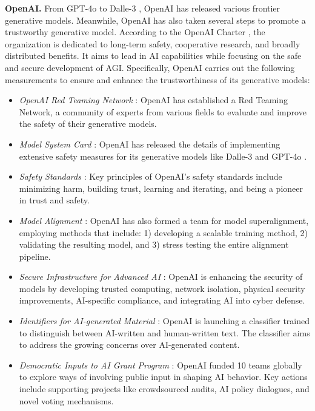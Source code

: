 \textbf{OpenAI.} From GPT-4o \cite{openai_gpt4o_system_card} to Dalle-3 \cite{ramesh2024dalle3}, OpenAI has released various frontier generative models. Meanwhile, OpenAI has also taken several steps to promote a trustworthy generative model. According to the OpenAI Charter \cite{openai_charter}, the organization is dedicated to long-term safety, cooperative research, and broadly distributed benefits. It aims to lead in AI capabilities while focusing on the safe and secure development of AGI. Specifically, OpenAI carries out the following measurements to ensure and enhance the trustworthiness of its generative models: 

\begin{itemize}[nolistsep, leftmargin=*]
    \item[] \textcolor[HTML]{e6e5e1}{\largedot} {\textit{OpenAI Red Teaming Network}} \cite{openai_red_teaming_network}: OpenAI has established a Red Teaming Network, a community of experts from various fields to evaluate and improve the safety of their generative models. 
    \item[] \textcolor[HTML]{e6e5e1}{\largedot} {\textit{Model System Card}} \cite{mitchell2019model,ramesh2024dalle3, openai_gpt4o_system_card}: OpenAI has released the details of implementing extensive safety measures for its generative models like Dalle-3 \cite{ramesh2024dalle3} and GPT-4o \cite{openai_gpt4o_system_card}.
    \item[] \textcolor[HTML]{e6e5e1}{\largedot} {\textit{Safety Standards}} \cite{openai_safety_standards, openai_safety_best_practices}: Key principles of OpenAI's safety standards include minimizing harm, building trust, learning and iterating, and being a pioneer in trust and safety.
    \item[] \textcolor[HTML]{e6e5e1}{\largedot} {\textit{Model Alignment}} \cite{openai_alignment_research, openai_superalignment}: OpenAI has also formed a team for model superalignment, employing methods that include: 1) developing a scalable training method, 2) validating the resulting model, and 3) stress testing the entire alignment pipeline.
    \item[] \textcolor[HTML]{e6e5e1}{\largedot} {\textit{Secure Infrastructure for Advanced AI}} \cite{openai_secure_infrastructure}: OpenAI is enhancing the security of models by developing trusted computing, network isolation, physical security improvements, AI-specific compliance, and integrating AI into cyber defense.
    \item[] \textcolor[HTML]{e6e5e1}{\largedot} {\textit{Identifiers for AI-generated Material}} \cite{openai_ai_classifier}: OpenAI is launching a classifier trained to distinguish between AI-written and human-written text. The classifier aims to address the growing concerns over AI-generated content.
    \item[] \textcolor[HTML]{e6e5e1}{\largedot} {\textit{Democratic Inputs to AI Grant Program}} \cite{openai_2024_democratic}: OpenAI funded 10 teams globally to explore ways of involving public input in shaping AI behavior. Key actions include supporting projects like crowdsourced audits, AI policy dialogues, and novel voting mechanisms.
\end{itemize}



